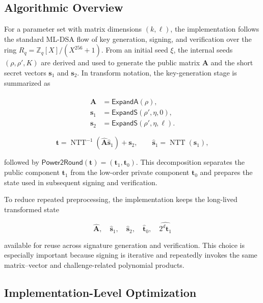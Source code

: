\documentclass[final, twoside]{IEEEtran} %
\providecommand{\DIFaddend}{} %
\DeclareRobustCommand{\DIFaddend}{\DIFOaddend \let\includegraphics\DIFOincludegraphics} %
\begin{document}
\DIFaddend \subsection{Algorithmic Overview}

For a parameter set with matrix dimensions $(k,\ell)$, the implementation follows the standard ML-DSA flow of key generation, signing, and verification over the ring $R_q = \mathbb{Z}_q[X]/(X^{256}+1)$. From an initial seed $\xi$, the internal seeds $(\rho,\rho',K)$ are derived and used to generate the public matrix $\mathbf{A}$ and the short secret vectors $\mathbf{s}_1$ and $\mathbf{s}_2$. In transform notation, the key-generation stage is summarized as

\begin{align}
\hat{\mathbf{A}} &= \mathsf{ExpandA}(\rho), \\
\mathbf{s}_1 &= \mathsf{ExpandS}(\rho',\eta,0), \\
\mathbf{s}_2 &= \mathsf{ExpandS}(\rho',\eta,\ell).
\end{align}

\begin{equation}
\mathbf{t} = \operatorname{NTT}^{-1}\!\left(\hat{\mathbf{A}}\hat{\mathbf{s}}_1\right) + \mathbf{s}_2,
\qquad
\hat{\mathbf{s}}_1 = \operatorname{NTT}(\mathbf{s}_1),
\end{equation}

followed by $\mathsf{Power2Round}(\mathbf{t}) = (\mathbf{t}_1,\mathbf{t}_0)$. This decomposition separates the public component $\mathbf{t}_1$ from the low-order private component $\mathbf{t}_0$ and prepares the state used in subsequent signing and verification.

To reduce repeated preprocessing, the implementation keeps the long-lived transformed state

\begin{equation}
\hat{\mathbf{A}}, \quad \hat{\mathbf{s}}_1, \quad \hat{\mathbf{s}}_2, \quad \hat{\mathbf{t}}_0, \quad \widehat{2^d\mathbf{t}_1}
\end{equation}

available for reuse across signature generation and verification. This choice is especially important because signing is iterative and repeatedly invokes the same matrix--vector and challenge-related polynomial products.

\subsection{Implementation-Level Optimization}
\end{document}
